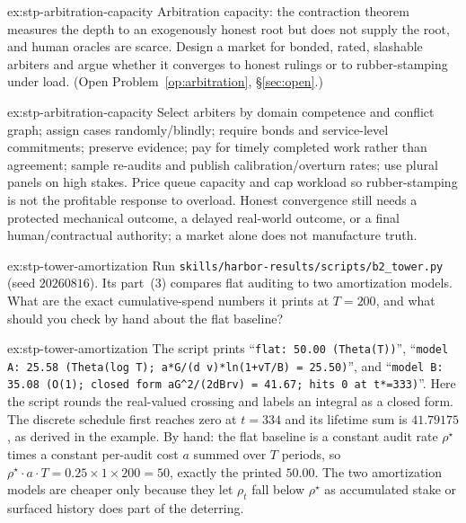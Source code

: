 \documentclass[11pt,a4paper]{article}
\theoremstyle{definition}
\begin{document}
\begin{pdexercise}[kind=Open,rating=3]{ex:stp-arbitration-capacity}
Arbitration capacity: the contraction theorem measures the depth to an
exogenously honest root but does not supply the root, and human oracles are
scarce. Design a market for bonded, rated, slashable arbiters and argue
whether it converges to honest rulings or to rubber-stamping under load.
(Open Problem~\ref{op:arbitration}, \S\ref{sec:open}.)
\end{pdexercise}
\begin{pdsolution}{ex:stp-arbitration-capacity}
Select arbiters by domain competence and conflict graph; assign cases
randomly/blindly; require bonds and service-level commitments; preserve
evidence; pay for timely completed work rather than agreement; sample
re-audits and publish calibration/overturn rates; use plural panels on high
stakes. Price queue capacity and cap workload so rubber-stamping is not the
profitable response to overload. Honest convergence still needs a protected
mechanical outcome, a delayed real-world outcome, or a final human/contractual
authority; a market alone does not manufacture truth.
\end{pdsolution}
\begin{pdexercise}[kind=Trace,rating=2]{ex:stp-tower-amortization}
Run \texttt{skills/harbor-results/scripts/b2\_tower.py} (seed $20260816$).
Its part~(3) compares flat auditing to two amortization models. What are the
exact cumulative-spend numbers it prints at $T=200$, and what should you
check by hand about the flat baseline?
\end{pdexercise}
\begin{pdsolution}{ex:stp-tower-amortization}
The script prints ``\texttt{flat: 50.00 (Theta(T))}'', ``\texttt{model A:
25.58 (Theta(log T); a*G/(d v)*ln(1+vT/B) = 25.50)}'', and ``\texttt{model B:
35.08 (O(1); closed form aG\textasciicircum2/(2dBrv) = 41.67; hits 0 at
t*=333)}''. Here the script rounds the real-valued crossing and labels an
integral as a closed form. The discrete schedule first reaches zero at
$t=334$ and its lifetime sum is $41.79175$, as derived in the example. By hand: the flat baseline is a constant audit rate $\rho^\star$
times a constant per-audit cost $a$ summed over $T$ periods, so
$\rho^\star\cdot a\cdot T=0.25\times 1\times 200=50$, exactly the printed
$50.00$. The two amortization models are cheaper only because they let
$\rho_t$ fall below $\rho^\star$ as accumulated stake or surfaced history
does part of the deterring.
\end{pdsolution}
\end{document}
